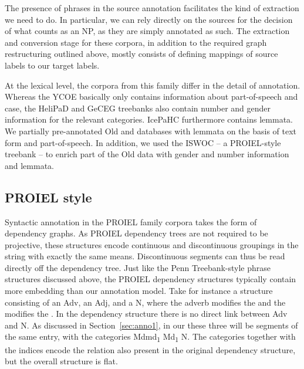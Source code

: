 \documentclass[output=paper,colorlinks,citecolor=brown]{langscibook}
\begin{document}
  
The presence of phrases in the source annotation facilitates the kind
of extraction we need to do. In particular, we can rely directly on
the sources for the decision of what counts as an NP, as they are
simply annotated as such. The extraction and conversion stage for
these corpora, in addition to the required graph restructuring
outlined above, mostly consists of defining mappings of source 
labels to our target  labels.

At the lexical level, the corpora from this family differ in the
detail of annotation. Whereas the YCOE basically only contains
information about part-of-speech and case, the HeliPaD and GeCEG
treebanks also contain number and gender information for the relevant
categories. IcePaHC furthermore contains lemmata. We partially
pre-annotated Old  and  databases with lemmata on the
basis of text form and part-of-speech. In addition, we used the ISWOC
 -- a PROIEL-style treebank -- to enrich part of the Old 
data with gender and number information and lemmata.

\subsection{PROIEL style}

Syntactic annotation in the PROIEL family corpora takes the form of
dependency graphs. As PROIEL dependency trees are not required to
be projective, these structures encode continuous and discontinuous
groupings in the string with exactly the same means. Discontinuous
segments can thus be read directly off the dependency tree. Just like
the Penn Treebank-style phrase structures discussed above, the PROIEL
dependency structures typically contain more embedding than our
annotation model. Take for instance a structure consisting of an Adv,
an Adj, and a N, where the adverb modifies the  and the
 modifies the . In the dependency structure there is no
direct link between Adv and N. As discussed in Section~\ref{sec:anno1}, in our  these
three will be segments of the same entry, with the categories
Mdmd\textsubscript{1} Md\textsubscript{1} N. The categories together with the
indices encode the relation also present in the original dependency
structure, but the overall structure is flat.
\end{document}
